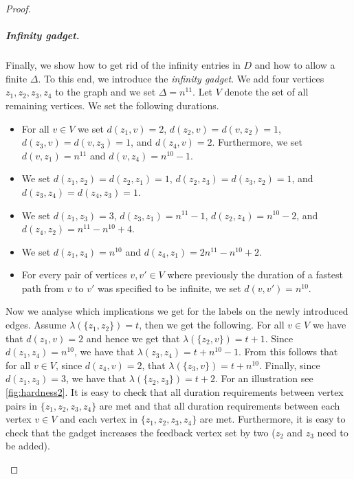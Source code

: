 \documentclass[a4paper,UKenglish,cleveref, autoref, thm-restate]{lipics-v2021}
\begin{document}
\begin{proof}
\subparagraph{Infinity gadget.} Finally, we show how to get rid of the infinity entries in $D$ and how to allow a finite $\Delta$. To this end, we introduce the \emph{infinity gadget}. We add four vertices $z_1, z_2, z_3, z_4$ to the graph and we set $\Delta=n^{11}$. Let $V$ denote the set of all remaining vertices. We set the following durations.
\begin{itemize}
    \item For all $v\in V$ we set $d(z_1,v)=2$, $d(z_2,v)=d(v,z_2)=1$, $d(z_3,v)=d(v,z_3)=1$, and $d(z_4,v)=2$.
    Furthermore, we set $d(v,z_1)=n^{11}$ and $d(v,z_4)=n^{10}-1$.
    \item We set $d(z_1,z_2)=d(z_2,z_1)=1$, $d(z_2,z_3)=d(z_3,z_2)=1$, and $d(z_3,z_4)=d(z_4,z_3)=1$.
    \item We set $d(z_1,z_3)=3$, $d(z_3,z_1)=n^{11}-1$, $d(z_2,z_4)=n^{10}-2$, and $d(z_4,z_2)=n^{11}-n^{10}+4$.
    \item We set $d(z_1,z_4)=n^{10}$ and $d(z_4,z_1)=2n^{11}-n^{10}+2$.
    \item For every pair of vertices $v,v'\in V$ where previously the duration of a fastest path from $v$ to $v'$ was specified to be infinite, we set $d(v,v')=n^{10}$.
\end{itemize}
Now we analyse which implications we get for the labels on the newly introduced edges.
Assume $\lambda(\{z_1,z_2\})=t$, then we get the following.
    For all $v\in V$ we have that $d(z_1,v)=2$ and hence we get that $\lambda(\{z_2,v\})=t+1$. 
    Since $d(z_1,z_4)=n^{10}$, we have that $\lambda(z_3,z_4)=t+n^{10}-1$.
    From this follows that for all $v\in V$, since $d(z_4,v)=2$, that $\lambda(\{z_3,v\})=t+n^{10}$.
    Finally, since $d(z_1,z_3)=3$, we have that $\lambda(\{z_2,z_3\})=t+2$.
For an illustration see \cref{fig:hardness2}. It is easy to check that all duration requirements between vertex pairs in $\{z_1,z_2,z_3,z_4\}$ are met and that all duration requirements between each vertex $v\in V$ and each vertex in  $\{z_1,z_2,z_3,z_4\}$ are met. Furthermore, it is easy to check that the gadget increases the feedback vertex set by two ($z_2$ and $z_3$ need to be added).

\begin{figure}[t]
\centering


\end{figure}
\end{proof}
\end{document}
